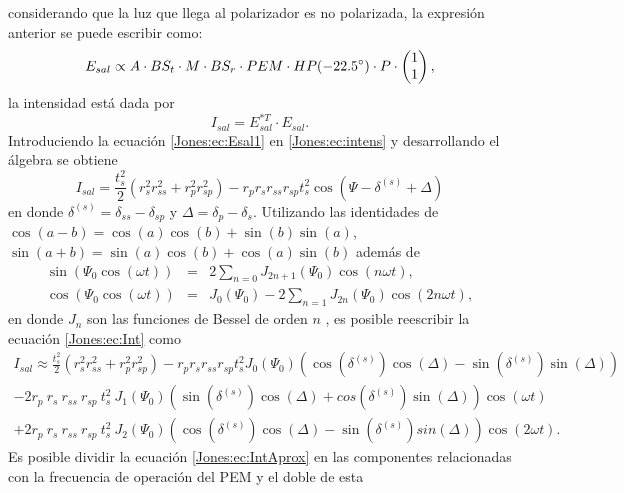 considerando que la luz que llega al polarizador es no polarizada, la expresi\'on anterior se puede escribir como:
\begin{equation}
E_{sal} \propto A \cdot BS_t \cdot M \cdot BS_r \cdot PEM \cdot HP(-22.5 \degree) \cdot P \cdot 
\begin{pmatrix}
1\\1
\end{pmatrix}, \label{Jones:ec:Esal1} 
\end{equation}
la intensidad est\'a dada por
\begin{equation}
I_{sal}= E_{sal}^{* T} \cdot E_{sal}. \label{Jones:ec:intens}
\end{equation}
Introduciendo la ecuaci\'on \ref{Jones:ec:Esal1} en \ref{Jones:ec:intens} y desarrollando el \'algebra se obtiene
\begin{equation}
I_{sal} = \frac{t_s ^2}{2}\left( r_s^2 r_{ss}^2 + r_p^2 r_{sp}^2 \right) -r_p r_s r_{ss} r_{sp} t_{s}^2  \cos(\Psi -\delta^{(s)}+\Delta) \label{Jones:ec:Int}
\end{equation}
en donde $\delta^{(s)}=\delta_{ss}-\delta_{sp}$ y $\Delta = \delta_p - \delta_s$. Utilizando las identidades de $\cos(a-b)=\cos(a)\cos(b)+ \sin(b)\sin(a)$, $\sin(a+b)= \sin(a)\cos(b)+\cos(a)\sin(b)$ adem\'as de 
\begin{eqnarray}
\sin(\Psi_0 \cos(\omega t))&=& 2 \sum_{n=0} J_{2n+1}(\Psi_0) \cos(n \omega t), \nonumber \\
\cos(\Psi_0 \cos(\omega t)) &=& J_0 (\Psi_0) - 2 \sum_{n=1} J_{2n} (\Psi_0) \cos(2n \omega t), \nonumber
\end{eqnarray}
en donde $J_n$ son las funciones de Bessel de orden $n$ \cite{doi:10.1063/1.3669782}, es posible reescribir la ecuaci\'on \ref{Jones:ec:Int} como 
\begin{multline}
I_{sal} \approx \frac{t_s ^2}{2}\left( r_s^2 r_{ss}^2 + r_p^2 r_{sp}^2 \right)-r_p r_s r_{ss} r_{sp} t_{s}^2 J_0(\Psi_0)(\cos(\delta^{(s)}) \cos(\Delta)-\sin(\delta^{(s)})\sin(\Delta))\\
-2r_p~ r_s~ r_{ss}~ r_{sp}~ t_{s}^2~ J_{1}(\Psi_0) (\sin(\delta^{(s)}) \cos(\Delta)+cos(\delta^{(s)})\sin(\Delta)) \cos(\omega t) \\
+2 r_p~ r_s ~r_{ss} ~r_{sp}~ t_{s}^2~ J_2(\Psi_0)(\cos(\delta^{(s)}) \cos(\Delta)-\sin(\delta^{(s)})sin(\Delta)) \cos(2 \omega t). \label{Jones:ec:IntAprox}
\end{multline}
Es posible dividir la ecuaci\'on \ref{Jones:ec:IntAprox} en las componentes relacionadas con la frecuencia  de operaci\'on del PEM y el doble de esta
